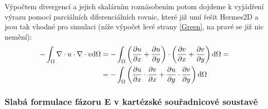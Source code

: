 \documentclass[12pt,a4paper,oneside]{article}
\numberwithin{equation}{section} %
\numberwithin{figure}{section} %
\numberwithin{table}{section} %
\begin{document}
Výpočtem divergencí a jejich skalárním roznásobením potom dojdeme k vyjádření výrazu pomocí parciálních diferenciálních rovnic, které již umí řešit Hermes2D a jsou tak vhodné pro simulaci (níže výpočet levé strany \ref{Green}, na pravé se již nic nemění):
\begin{equation}
\begin{split}
- \int _{\Omega} \nabla \cdot u \cdot \nabla \cdot v \mathrm{d} \Omega &= - \int _{\Omega} \left( \frac{\partial u}{\partial x} + \frac{\partial u}{\partial y} \right) \cdot \left( \frac{\partial v}{\partial x} + \frac{\partial v}{\partial y} \right) \mathrm{d} \Omega =\\
&= - \int _{\Omega} \left( \frac{\partial u}{\partial x} \cdot \frac{\partial v}{\partial x} + \frac{\partial u}{\partial y} \cdot \frac{\partial v}{\partial y} \right) \mathrm{d} \Omega
\end{split}
\end{equation}


\subsubsection{Slabá formulace fázoru E v kartézské souřadnicové soustavě}
\end{document}
